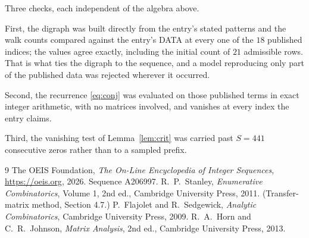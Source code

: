\documentclass[11pt,a4paper]{article}
\theoremstyle{plain}
\theoremstyle{definition}
\begin{document}
Three checks, each independent of the algebra above.

First, the digraph was built directly from the entry's stated patterns and the walk counts
compared against the entry's DATA at every one of the $18$ published indices; the
values agree exactly, including the initial count of $21$ admissible rows. That is
what ties the digraph to the sequence, and a model reproducing only part of the published
data was rejected wherever it occurred.

Second, the recurrence \eqref{eq:conj} was evaluated on those published terms in exact
integer arithmetic, with no matrices involved, and vanishes at every index the entry claims.

Third, the vanishing test of Lemma~\ref{lem:crit} was carried past $S=441$ consecutive
zeros rather than to a sampled prefix.

\begin{thebibliography}{9}
 The OEIS Foundation, \emph{The On-Line Encyclopedia of Integer
Sequences}, \url{https://oeis.org}, 2026. Sequence A206997.
 R.~P.~Stanley, \emph{Enumerative Combinatorics}, Volume 1, 2nd ed.,
Cambridge University Press, 2011. (Transfer-matrix method, Section 4.7.)
 P.~Flajolet and R.~Sedgewick, \emph{Analytic Combinatorics}, Cambridge
University Press, 2009.
 R.~A.~Horn and C.~R.~Johnson, \emph{Matrix Analysis}, 2nd ed., Cambridge
University Press, 2013.
\end{thebibliography}
\end{document}
